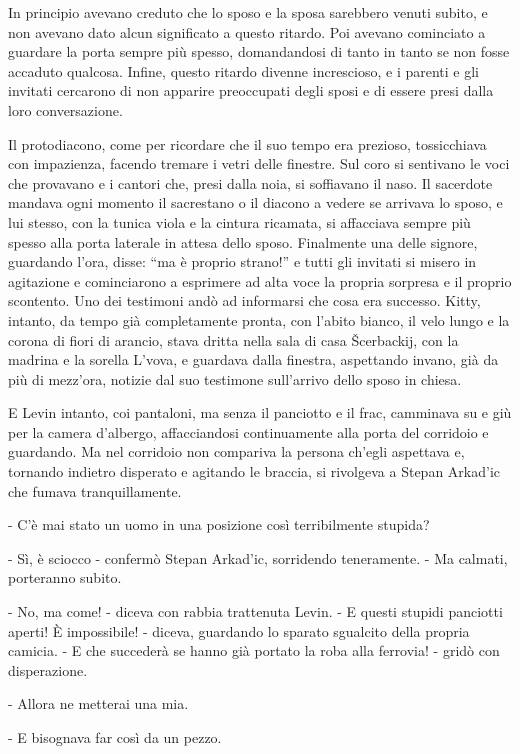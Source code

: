 In principio avevano creduto che lo sposo e la sposa sarebbero venuti subito, e non avevano dato alcun significato a questo ritardo. Poi avevano cominciato a guardare la porta sempre più spesso, domandandosi di tanto in tanto se non fosse accaduto qualcosa. Infine, questo ritardo divenne increscioso, e i parenti e gli invitati cercarono di non apparire preoccupati degli sposi e di essere presi dalla loro conversazione. 

Il protodiacono, come per ricordare che il suo tempo era prezioso, tossicchiava con impazienza, facendo tremare i vetri delle finestre. Sul coro si sentivano le voci che provavano e i cantori che, presi dalla noia, si soffiavano il naso. Il sacerdote mandava ogni momento il sacrestano o il diacono a vedere se arrivava lo sposo, e lui stesso, con la tunica viola e la cintura ricamata, si affacciava sempre più spesso alla porta laterale in attesa dello sposo. Finalmente una delle signore, guardando l'ora, disse: ``ma è proprio strano!'' e tutti gli invitati si misero in agitazione e cominciarono a esprimere ad alta voce la propria sorpresa e il proprio scontento. Uno dei testimoni andò ad informarsi che cosa era successo. Kitty, intanto, da tempo già completamente pronta, con l'abito bianco, il velo lungo e la corona di fiori di arancio, stava dritta nella sala di casa Šcerbackij, con la madrina e la sorella L'vova, e guardava dalla finestra, aspettando invano, già da più di mezz'ora, notizie dal suo testimone sull'arrivo dello sposo in chiesa. 

E Levin intanto, coi pantaloni, ma senza il panciotto e il frac, camminava su e giù per la camera d'albergo, affacciandosi continuamente alla porta del corridoio e guardando. Ma nel corridoio non compariva la persona ch'egli aspettava e, tornando indietro disperato e agitando le braccia, si rivolgeva a Stepan Arkad'ic che fumava tranquillamente. 

- C'è mai stato un uomo in una posizione così terribilmente stupida? 

- Sì, è sciocco - confermò Stepan Arkad'ic, sorridendo teneramente. - Ma calmati, porteranno subito. 

- No, ma come! - diceva con rabbia trattenuta Levin. - E questi stupidi panciotti aperti! È impossibile! - diceva, guardando lo sparato sgualcito della propria camicia. - E che succederà se hanno già portato la roba alla ferrovia! - gridò con disperazione. 

- Allora ne metterai una mia. 

- E bisognava far così da un pezzo. 

